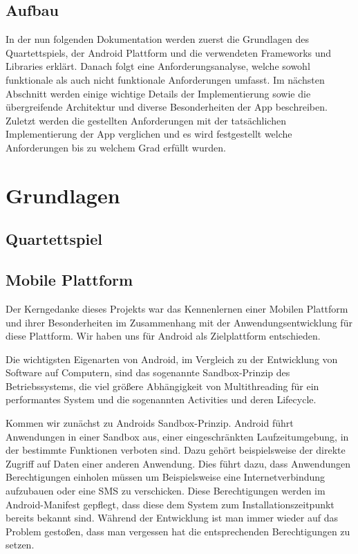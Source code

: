 \documentclass{scrartcl}
\begin{document}
\subsection{Aufbau}

In der nun folgenden Dokumentation werden zuerst die Grundlagen des
Quartettspiels, der Android Plattform und die verwendeten Frameworks und
Libraries erklärt. Danach folgt eine Anforderungsanalyse, welche sowohl
funktionale als auch nicht funktionale Anforderungen umfasst. Im nächsten
Abschnitt werden einige wichtige Details der Implementierung sowie die
übergreifende Architektur und diverse Besonderheiten der App beschreiben.
Zuletzt werden die gestellten Anforderungen mit der tatsächlichen
Implementierung der App verglichen und es wird festgestellt welche Anforderungen
bis zu welchem Grad erfüllt wurden.

\section{Grundlagen}
\subsection{Quartettspiel}
\subsection{Mobile Plattform}
Der Kerngedanke dieses Projekts war das Kennenlernen einer Mobilen Plattform und ihrer Besonderheiten im Zusammenhang mit der Anwendungsentwicklung für diese Plattform.
Wir haben uns für Android als Zielplattform entschieden.

Die wichtigsten Eigenarten von Android, im Vergleich zu der Entwicklung von Software auf Computern, sind das sogenannte Sandbox-Prinzip des Betriebssystems, die viel größere Abhängigkeit von Multithreading für ein performantes System und die sogenannten Activities und deren Lifecycle.

Kommen wir zunächst zu Androids Sandbox-Prinzip. Android führt Anwendungen in einer Sandbox aus, einer eingeschränkten Laufzeitumgebung, in der bestimmte Funktionen verboten sind. Dazu gehört beispielsweise der direkte Zugriff auf Daten einer anderen Anwendung. Dies führt dazu, dass Anwendungen Berechtigungen einholen müssen um Beispielsweise eine Internetverbindung aufzubauen oder eine SMS zu verschicken. Diese Berechtigungen werden im Android-Manifest gepflegt, dass diese dem System zum Installationszeitpunkt bereits bekannt sind. Während der Entwicklung ist man immer wieder auf das Problem gestoßen, dass man vergessen hat die entsprechenden Berechtigungen zu setzen.
\end{document}
